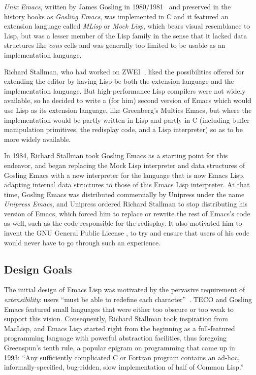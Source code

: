 \documentclass[format=acmsmall,screen]{acmart}
\newcommand \Elisp {Emacs Lisp}
\begin{document}
\emph{Unix Emacs}, written by James Gosling in 1980/1981~\cite{Gosling1981}
and preserved in the history books as \emph{Gosling Emacs},
was implemented in C and it featured an extension
language called \emph{MLisp} or \emph{Mock Lisp}, which bears visual
resemblance to Lisp, but was a lesser member of the Lisp family in the
sense that it lacked data structures like \emph{cons} cells and was
generally too limited to be usable as an implementation language.

Richard Stallman, who had worked on
ZWEI~\cite{Stallman2018-personal}, liked the possibilities offered for
extending the editor by having Lisp be both the extension language and the
implementation language.  But high-performance Lisp compilers were not
widely available, so he decided to write a (for him) second version of Emacs
which would use Lisp as its extension language, like Greenberg's Multics
Emacs, but where the implementation would be partly written in Lisp and
partly in C (including buffer manipulation primitives, the redisplay code,
and a Lisp interpreter) so as to be more widely available.

In 1984, Richard Stallman took Gosling Emacs as a starting point for this
endeavor, and began replacing
the Mock Lisp interpreter and data structures of Gosling Emacs
with a new interpreter for the language that is now \Elisp{}, adapting
internal data structures to those of
this \Elisp{} interpreter.  At that time, Gosling Emacs was distributed
commercially by Unipress under the name \emph{Unipress Emacs}, and Unipress
ordered Richard Stallman to stop distributing his version of Emacs, which
forced him to replace or rewrite the rest of Emacs's code as well, such as
the code responsible for the redisplay.  It also motivated him to invent the
GNU General Public License \cite{GPLHistory}, to try and ensure that users
of his code would never have to go through such an experience.

\subsection{Design Goals}

The initial design of \Elisp{} was motivated by the pervasive requirement of
\emph{extensibility}: users ``must be able to redefine each
character''~\cite{Stallman1981}.  TECO and Gosling Emacs featured small
languages that were either too obscure or too weak to support this vision.
Consequently, Richard Stallman took inspiration from MacLisp, and \Elisp{}
started right from the beginning as a full-featured programming language with
powerful abstraction facilities, thus foregoing Greenspun's tenth
rule, a popular epigram on programming that came up in  1993: ``Any
sufficiently complicated C or Fortran program contains an
ad-hoc, informally-specified, bug-ridden, slow implementation of half of
Common Lisp.''~\cite{GreenspunsRule}
\end{document}
